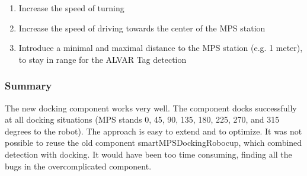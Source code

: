 \begin{enumerate}
\item Increase the speed of turning
\item Increase the speed of driving towards the center of the MPS station
\item Introduce a minimal and maximal distance to the MPS station (e.g. 1 meter), to stay in range for the ALVAR Tag detection
\end{enumerate}
 

\subsubsection{Summary}
The new docking component works very well. The component docks successfully at all docking situations (MPS stands 0, 45, 90, 135, 180, 225, 270, and 315 degrees to the robot).
The approach is easy to extend and to optimize. It was not possible to reuse the old component smartMPSDockingRobocup, which combined detection with docking. It would have been too time consuming, finding all the bugs in the overcomplicated component. 
